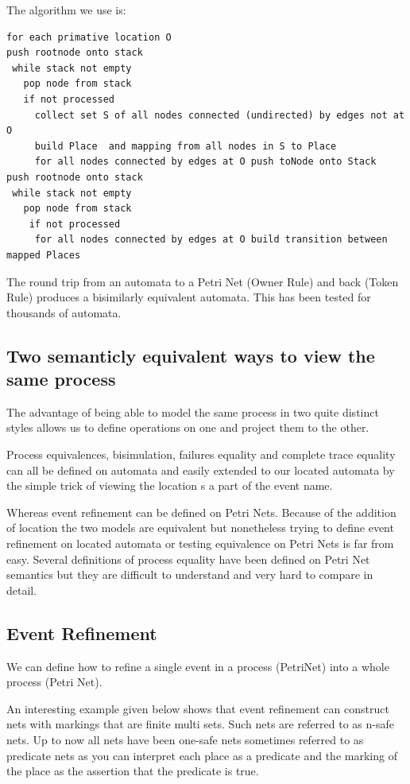 \documentclass[]{article}
\begin{document}
 The algorithm we use is:
 \begin{verbatim}
for each primative location O  
push rootnode onto stack
 while stack not empty
   pop node from stack 
   if not processed  
     collect set S of all nodes connected (undirected) by edges not at O
     build Place  and mapping from all nodes in S to Place
     for all nodes connected by edges at O push toNode onto Stack
push rootnode onto stack
 while stack not empty
   pop node from stack 
    if not processed  
     for all nodes connected by edges at O build transition between mapped Places        
 \end{verbatim}
 
 The round trip from an automata to a Petri Net (Owner Rule) and back  (Token Rule) produces a bisimilarly  equivalent automata. This has been tested for thousands of automata.

\subsection*{Two semanticly equivalent ways to view the same process}
The advantage of being able to model the same process in two quite distinct styles allows us to define operations on one and project them to the other.

Process equivalences, bisimulation, failures equality and complete trace equality can all be defined on automata and easily extended to our {\sf located automata} by the simple trick of viewing the location s a part of the event name.

Whereas event refinement can be defined on Petri Nets.  Because of the addition of location the two models are equivalent but nonetheless trying to define event refinement on located automata or testing equivalence on Petri Nets is far from easy.  Several definitions of process equality have been defined on Petri Net semantics but they are difficult to understand and very hard to compare in detail. 


\subsection*{Event Refinement}
We can define how to refine a single  event in a process (PetriNet) into a whole process (Petri Net). 

An  interesting example given below shows that event refinement can construct nets with markings that are finite multi sets. Such nets are referred to as {\sf n-safe nets}. Up to now all nets have been {\sf one-safe nets} sometimes referred to as predicate nets as you can interpret each place as a predicate and the marking of the place as the assertion that the predicate is true.
\end{document}
